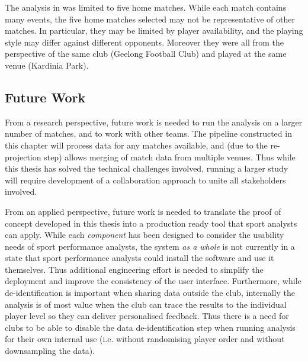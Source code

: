 
The analysis in  was limited to five home matches. While each match contains many events, the five home matches selected may not be representative of other matches. In particular, they may be limited by player availability, and the playing style may differ against different opponents. Moreover they were all from the perspective of the same club (Geelong Football Club) and played at the same venue (Kardinia Park).

\subsection*{Future Work}

From a research perspective, future work is needed to run the analysis on a larger number of matches, and to work with other \afl{} teams. The pipeline constructed in this chapter will process data for any matches available, and (due to the re-projection step) allows merging of match data from multiple venues. Thus while this thesis has solved the technical challenges involved, running a larger study will require development of a collaboration approach to unite all stakeholders involved.

From an applied perspective, future work is needed to translate the proof of concept developed in this thesis into a production ready tool that sport analysts can apply. While each \textit{component} has been designed to consider the usability needs of sport performance analysts, the system \textit{as a whole} is not currently in a state that sport performance analysts could install the software and use it themselves. Thus additional engineering effort is needed to simplify the deployment and improve the consistency of the user interface. Furthermore, while de-identification is important when sharing data outside the club, internally the analysis is of most value when the club can trace the results to the individual player level so they can deliver personalised feedback. Thus there is a need for clubs to be able to disable the data de-identification step when running analysis for their own internal use (i.e. without randomising player order and without downsampling the data).

